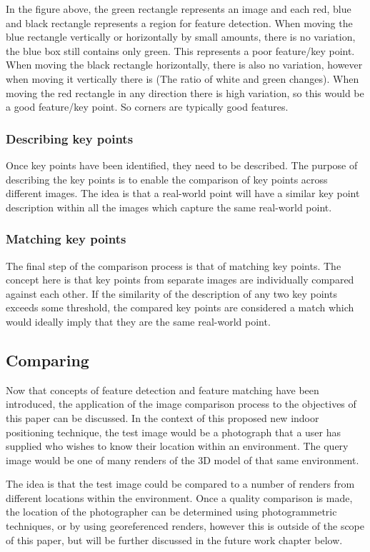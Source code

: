 \documentclass[11pt,a4paper]{report}
\begin{document}
				In the figure above, the green rectangle represents an image and each red, blue and black rectangle represents a region for feature detection. When moving the blue rectangle vertically or horizontally by small amounts, there is no variation, the blue box still contains only green. This represents a poor feature/key point. 
				When moving the black rectangle horizontally, there is also no variation, however when moving it vertically there is (The ratio of white and green changes). When moving the red rectangle in any direction there is high variation, so this would be a good feature/key point. So corners are typically good features.
				
			\subsubsection{Describing key points}
				Once key points have been identified, they need to be described. The purpose of describing the key points is to enable the comparison of key points across different images. The idea is that a real-world point will have a similar key point description within all the images which capture the same real-world point.
				
			\subsubsection{Matching key points}
				The final step of the comparison process is that of matching key points. The concept here is that key points from separate images are individually compared against each other. If the similarity of the description of any two key points exceeds some threshold, the compared key points are considered a match which would ideally imply that they are the same real-world point.
		
		\subsection{Comparing}
			Now that concepts of feature detection and feature matching have been introduced, the application of the image comparison process to the objectives of this paper can be discussed.
			In the context of this proposed new indoor positioning technique, the test image would be a photograph that a user has supplied who wishes to know their location within an environment. The query image would be one of many renders of the 3D model of that same environment.
			
			The idea is that the test image could be compared to a number of renders from different locations within the environment. Once a quality comparison is made, the location of the photographer can be determined using photogrammetric techniques, or by using georeferenced renders, however this is outside of the scope of this paper, but will be further discussed in the future work chapter below.
	
\end{document}
